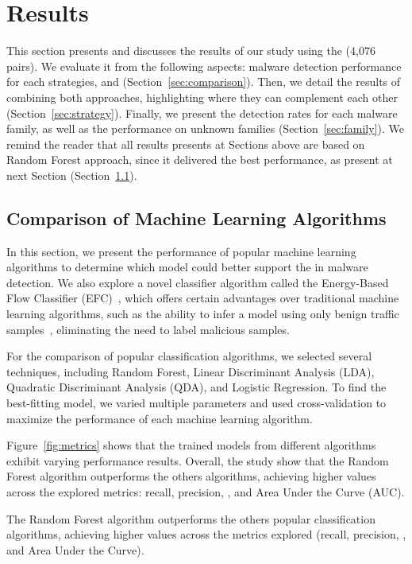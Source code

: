 \section{Results}\label{sec:results}

This section presents and discusses the results of our study using the \cds  (4,076 pairs). We evaluate it from the following aspects: malware detection performance for each strategies, \mas and \net (Section~\ref{sec:comparison}). Then, we detail the results of combining both approaches, highlighting where they can complement each other (Section~\ref{sec:strategy}). Finally, we present the detection rates for each malware family, as well as the performance on unknown families (Section~\ref{sec:family}). We remind the reader that all results presents at Sections above are based on Random Forest approach, since it delivered the best performance, as present at next Section (Section~\ref{sec:ml}).

\subsection{Comparison of Machine Learning Algorithms}\label{sec:ml}

In this section, we present the performance of popular machine learning algorithms to determine which model could better support the \mas in malware detection. We also explore a novel classifier algorithm called the Energy-Based Flow Classifier (EFC)~\cite{DBLP:journals/tnsm/PontesSGBM21}, which offers certain advantages over traditional machine learning algorithms, such as the ability to infer a model using only benign traffic samples~\cite{DBLP:journals/tnsm/PontesSGBM21}, eliminating the need to label malicious samples.

For the comparison of popular classification algorithms, we selected several techniques, including Random Forest, Linear Discriminant Analysis (LDA), Quadratic Discriminant Analysis (QDA), and Logistic Regression. To find the best-fitting model, we varied multiple parameters and used cross-validation to maximize the performance of each machine learning algorithm.

Figure~\ref{fig:metrics} shows that the trained models from different algorithms exhibit varying performance results. Overall, the study show that the Random Forest algorithm outperforms the others algorithms, achieving higher values across the explored metrics: recall, precision, \fone, and Area Under the Curve (AUC).

\begin{finding}
  The Random Forest algorithm outperforms the others popular classification algorithms, achieving higher values across the metrics explored (recall, precision, \fone, and Area Under the Curve).
\end{finding}


